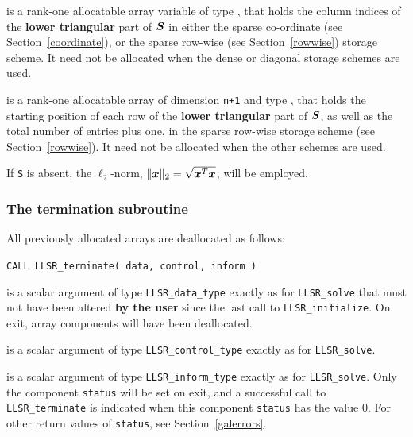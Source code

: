 \documentclass{galahad}
\newcommand{\packagename}{LLSR}
\begin{document}
\begin{description}
\begin{description}
 is a rank-one allocatable array variable of type \integer,
that holds the column indices of the {\bf lower triangular} part of
${\bm{S}}$ in either the sparse co-ordinate
(see Section~\ref{coordinate}), or the sparse row-wise
(see Section~\ref{rowwise}) storage scheme.
It need not be allocated when the dense or diagonal storage schemes are used.

 is a rank-one allocatable array of dimension {\tt n+1} and type
\integer, that holds the starting position of
each row of the {\bf lower triangular} part of ${\bm{S}}$, as well
as the total number of entries plus one, in the sparse row-wise storage
scheme (see Section~\ref{rowwise}). It need not be allocated when the
other schemes are used.

\end{description}
If {\tt S} is absent, the $\ell_2$-norm, $\|{\bm{x}}\|_2 = \sqrt{{\bm{x}}^T {\bm{x}}}$,
will be employed.


\end{description}


\subsubsection{The  termination subroutine}
All previously allocated arrays are deallocated as follows:

\hskip0.5in
{\tt CALL \packagename\_terminate( data, control, inform )}

\begin{description}

 is a scalar \intentinout argument of type
{\tt \packagename\_data\_type}
exactly as for
{\tt \packagename\_solve}
that must not have been altered {\bf by the user} since the last call to
{\tt \packagename\_initialize}.
On exit, array components will have been deallocated.

 is a scalar \intentin argument of type
{\tt \packagename\_control\_type}
exactly as for
{\tt \packagename\_solve}.

 is a scalar \intentout argument of type
{\tt \packagename\_inform\_type}
exactly as for
{\tt \packagename\_solve}.
Only the component {\tt status} will be set on exit, and a
successful call to
{\tt \packagename\_terminate}
is indicated when this  component {\tt status} has the value 0.
For other return values of {\tt status}, see Section~\ref{galerrors}.

\end{description}
\end{document}
